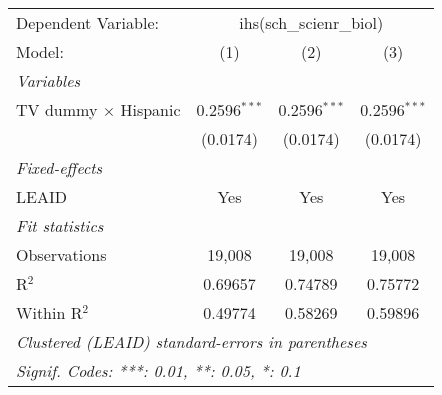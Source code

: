 \begin{tabular}{lccc}
\tabularnewline\midrule\midrule
Dependent Variable:&\multicolumn{3}{c}{ihs(sch\_scienr\_biol)}\\
Model:&(1) & (2) & (3)\\
\midrule \emph{Variables}&   &   &  \\
TV dummy $\times$ Hispanic & 0.2596$^{***}$ & 0.2596$^{***}$ & 0.2596$^{***}$\\
  &(0.0174) & (0.0174) & (0.0174)\\
\midrule \emph{Fixed-effects}&   &   &  \\
LEAID & Yes & Yes & Yes\\
\midrule \emph{Fit statistics}&  & & \\
Observations & 19,008&19,008&19,008\\
R$^2$ & 0.69657&0.74789&0.75772\\
Within R$^2$ & 0.49774&0.58269&0.59896\\
\midrule\midrule\multicolumn{4}{l}{\emph{Clustered (LEAID) standard-errors in parentheses}}\\
\multicolumn{4}{l}{\emph{Signif. Codes: ***: 0.01, **: 0.05, *: 0.1}}\\
\end{tabular}


